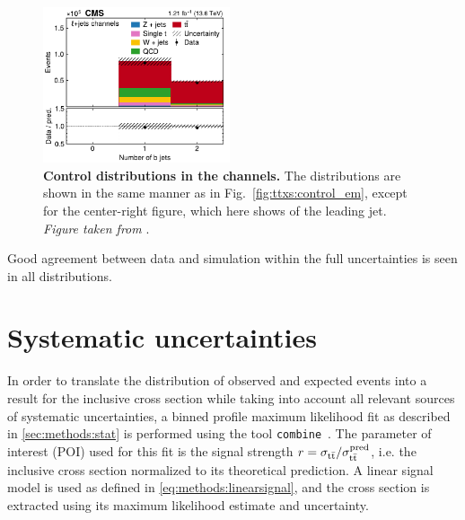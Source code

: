 \begin{figure}[!hp]
\hfill
\includegraphics[width=0.49\textwidth]{figures/ttxs/nbtag_lj.pdf}
\caption{
   \textbf{Control distributions in the \ljets channels.} The distributions are shown in the same manner as in Fig.~\ref{fig:ttxs:control_em}, except for the center-right figure, which here shows \abseta of the leading jet. \textit{Figure taken from }.
}
\label{fig:ttxs:control_ljets}
\end{figure}

Good agreement between data and simulation within the full uncertainties is seen in all distributions.



\section{Systematic uncertainties}
\label{sec:ttxs:systematics}


In order to translate the distribution of observed and expected events into a result for the inclusive \ttbar cross section while taking into account all relevant sources of systematic uncertainties, a binned profile maximum likelihood fit as described in \cref{sec:methods:stat} is performed using the tool \texttt{combine}~\cite{CMS:CAT-23-001}.
The parameter of interest (POI) used for this fit is the signal strength $r = \sigma_{\mathrm{t \bar{t}}} / \sigma_{\mathrm{t \bar{t}}}^{\text{pred}}$, i.e. the inclusive \ttbar cross section normalized to its theoretical prediction. A linear signal model is used as defined in \cref{eq:methods:linearsignal}, and the \ttbar cross section is extracted using its maximum likelihood estimate and uncertainty.

